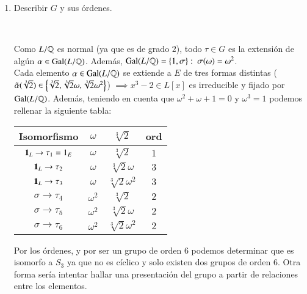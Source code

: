 \begin{eg}
\begin{enumerate}
        \item Describir $G$ y sus órdenes.\\
        \begin{center}
            \\
        \end{center}
        Como $L/\mathbb{Q}$ es normal (ya que es de grado $2$), todo $\tau \in G$ es la extensión de algún $\alpha \in \mathrm{Gal}(L/\mathbb{Q})$. Además, $\mathrm{Gal}(L/\mathbb{Q}) = \left\{1, \sigma\right\}:\ \sigma(\omega) = \omega^2$.\\
        Cada elemento $\alpha \in \mathrm{Gal}(L/\mathbb{Q})$ se extiende a $E$ de tres formas distintas ($\tilde\alpha(\sqrt[3]{2}) \in \left\{\sqrt[3]{2}, \sqrt[3]{2}\omega, \sqrt[3]{2}\omega^2\right\}$) $\implies x^3-2 \in L[x]$ es irreducible y fijado por $\mathrm{Gal}(L/\mathbb{Q})$.
        Además, teniendo en cuenta que $\omega^2+\omega+1 = 0$ y $\omega^3 = 1$ podemos rellenar la siguiente tabla:
        \begin{center}
            \begin{tabular}{|c||c|c|c|}
            \hline
            Isomorfismo                 & $\omega$   & $\sqrt[3]{2}$         & ord\\ \hline \hline
            $\mathbf{1}_L   \rightarrow \tau_1 = 1_E$ & $\omega$   & $\sqrt[3]{2}$         & $1$\\ \hline
            $\mathbf{1}_L   \rightarrow \tau_2$       & $\omega$   & $\sqrt[3]{2}\omega$   & $3$\\ \hline
            $\mathbf{1}_L   \rightarrow \tau_3$       & $\omega$   & $\sqrt[3]{2}\omega^2$ & $3$\\ \hline
            $\sigma \rightarrow \tau_4$       & $\omega^2$ & $\sqrt[3]{2}$         & $2$\\ \hline
            $\sigma \rightarrow \tau_5$       & $\omega^2$ & $\sqrt[3]{2}\omega$   & $2$\\ \hline
            $\sigma \rightarrow \tau_6$       & $\omega^2$ & $\sqrt[3]{2}\omega^2$ & $2$\\ \hline
            \end{tabular}
        \end{center}
        Por los órdenes, y por ser un grupo de orden $6$ podemos determinar que es isomorfo a $S_3$ ya que no es cíclico y solo existen dos grupos de orden $6$. Otra forma sería intentar hallar una presentación del grupo a partir de relaciones entre los elementos.

\end{enumerate}
\end{eg}

